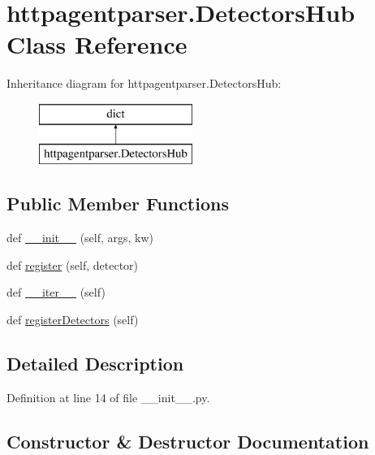 \hypertarget{classhttpagentparser_1_1_detectors_hub}{}\section{httpagentparser.\+Detectors\+Hub Class Reference}
\label{classhttpagentparser_1_1_detectors_hub}
Inheritance diagram for httpagentparser.\+Detectors\+Hub\+:\begin{figure}[H]
\begin{center}
\leavevmode
\includegraphics[height=2.000000cm]{classhttpagentparser_1_1_detectors_hub}
\end{center}
\end{figure}
\subsection*{Public Member Functions}
\begin{DoxyCompactItemize}
\item 
def \hyperlink{classhttpagentparser_1_1_detectors_hub_a3b24dca4b0614d69c8abeb235981fdcc}{\+\_\+\+\_\+init\+\_\+\+\_\+} (self, args, kw)
\item 
def \hyperlink{classhttpagentparser_1_1_detectors_hub_aaaec4b81fb2e83563d46c2dfcc43f9ba}{register} (self, detector)
\item 
def \hyperlink{classhttpagentparser_1_1_detectors_hub_a4320210b2d22e1a6c47c15ff470ffc94}{\+\_\+\+\_\+iter\+\_\+\+\_\+} (self)
\item 
def \hyperlink{classhttpagentparser_1_1_detectors_hub_a5f500e3fc543a7981556a0a9e9d1241c}{register\+Detectors} (self)
\end{DoxyCompactItemize}


\subsection{Detailed Description}


Definition at line 14 of file \+\_\+\+\_\+init\+\_\+\+\_\+.\+py.



\subsection{Constructor \& Destructor Documentation}
\hypertarget{classhttpagentparser_1_1_detectors_hub_a3b24dca4b0614d69c8abeb235981fdcc}{}\label{classhttpagentparser_1_1_detectors_hub_a3b24dca4b0614d69c8abeb235981fdcc} 
